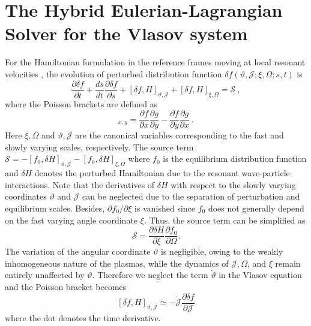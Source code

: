 \section{The Hybrid Eulerian-Lagrangian Solver for the Vlasov system}
\label{sec:vlasov}
For the Hamiltonian formulation 
 in the reference frames moving at local resonant velocities \cite{zheng2023a},
 the evolution of  perturbed distribution function $\delta f(\vartheta,\mathcal{J};\xi,\Omega;s,t)$ is
\begin{equation}\label{eq.deltaf}
    \frac{\partial \delta f}{\partial t}+ \frac{d s}{d t} \frac{\partial \delta f}{\partial s} + \left[\delta f, H\right]_{\vartheta,\mathcal{J}} +  \left[\delta f, H\right]_{\xi,\Omega} = \mathcal{S}~,
\end{equation}
where the   Poisson brackets are defined as
\begin{equation}
    [f,~g]_{x,y} = \frac{\partial f}{\partial x}\frac{\partial g}{\partial y}-\frac{\partial f}{\partial y}\frac{\partial g}{\partial x}~.
\end{equation}
Here $\xi,\Omega$ and $\vartheta,\mathcal{J}$ are the canonical variables corresponding to the fast  and slowly varying scales, respectively.
The source term $\mathcal{S}= -\left[f_0, \delta H\right]_{\vartheta, \mathcal{J}} - \left[f_0, \delta H\right]_{\xi, \Omega}$ 
where $f_0$ is the equilibrium distribution function and $\delta H$ denotes the perturbed Hamiltonian due to the resonant wave-particle interactions.
Note that the derivatives of $\delta H$ with respect to the slowly varying coordinates $\vartheta$ and $\mathcal{J}$ can be neglected due to the separation of perturbation and equilibrium scales. Besides, $\partial f_0/\partial \xi$ is vanished since $f_0$ does not generally depend on the fast varying angle coordinate $\xi$.
Thus, the source term can be simplified as 
\begin{equation}
     \mathcal{S} = \frac{\partial \delta H}{\partial \xi}\frac{\partial f_0}{\partial \Omega}.
\end{equation}
The variation of the angular coordinate $\vartheta$ is negligible, owing to the weakly inhomogeneous nature of the plasmas, while the dynamics of $\mathcal{J}, \Omega$, and $\xi$ remain entirely unaffected by $\vartheta$.
Therefore we neglect the term $ \dot{\vartheta} $ in the Vlasov equation and the  Poisson bracket becomes
\begin{equation}
\left[\delta f, H\right]_{\vartheta,\mathcal{J}}\simeq 
 -\dot{\mathcal{J}} \frac{\partial \delta f}{\partial \mathcal{J}}      
\end{equation}
where the dot denotes the time derivative.

